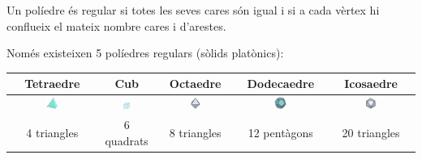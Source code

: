 \begin{theorybox}
	Un políedre és regular si totes les seves cares són igual i si a cada vèrtex hi conflueix el mateix nombre cares i d'arestes.
	
	Només existeixen 5 políedres regulars (sòlids platònics):
	\begin{center}
		\begin{tabular}{|c|c|c|c|c|}\hline
			\rowcolor{lightgray} Tetraedre & Cub & Octaedre & Dodecaedre & Icosaedre \\ \hline
			\includegraphics[width=0.15\textwidth]{img-11/tetraedro} &
			\includegraphics[width=0.15\textwidth]{img-11/poliedro-convexo} &
			\includegraphics[width=0.15\textwidth]{img-11/octaedre} &
			\includegraphics[width=0.15\textwidth]{img-11/dodecaedre} &
			\includegraphics[width=0.15\textwidth]{img-11/icosaedre} \\
			4 triangles &   6 quadrats  & 8 triangles &  12 pentàgons & 20 triangles  \\ \hline
		\end{tabular}
	\end{center}
\end{theorybox}

